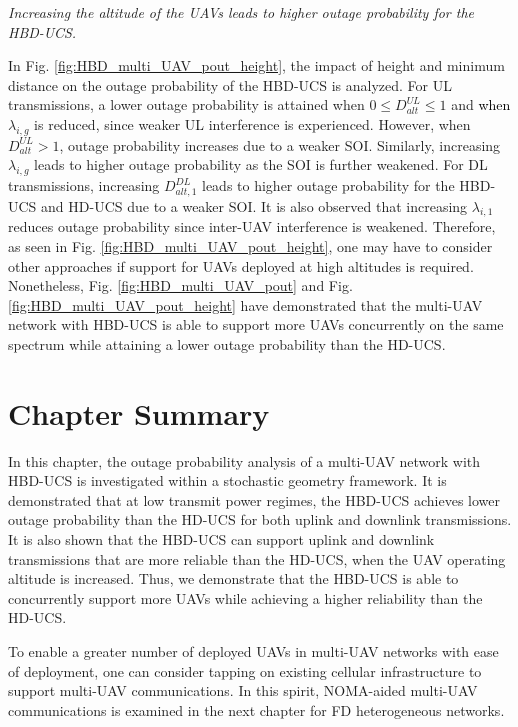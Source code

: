 \begin{observation}
\emph{\emph{Increasing the altitude of the UAVs leads to higher outage probability for the HBD-UCS.}}
\end{observation}

In Fig. \ref{fig:HBD_multi_UAV_pout_height}, the impact of height and minimum distance on the outage probability of the HBD-UCS is analyzed. For UL transmissions, a lower outage probability is attained when $ 0 \leq D_{alt}^{UL} \leq 1$ and \textcolor{black}{when} $\lambda_{i,g}$ is reduced, since weaker UL interference is experienced. However, when $D_{alt}^{UL} > 1$, outage probability increases due to a weaker SOI. Similarly, increasing $\lambda_{i,g}$ leads to higher outage probability as the SOI is further weakened. For DL transmissions, increasing $D_{alt,1}^{DL}$ leads to higher outage probability for the HBD-UCS and HD-UCS due to a weaker SOI. It is also observed that increasing $\lambda_{i,1}$ reduces outage probability since inter-UAV interference is weakened. Therefore, as seen in Fig. \ref{fig:HBD_multi_UAV_pout_height}, one may have to consider other approaches if support for UAVs deployed at high altitudes is required. Nonetheless, Fig. \ref{fig:HBD_multi_UAV_pout} and Fig. \ref{fig:HBD_multi_UAV_pout_height} have demonstrated that the multi-UAV network with HBD-UCS is able to support more UAVs concurrently on the same spectrum while attaining a lower outage probability than the HD-UCS.

\section{Chapter Summary} \label{HBD_multi_UAV_sec_conclusion}

In this chapter, the outage probability analysis of a multi-UAV network with HBD-UCS is investigated within a stochastic geometry framework. It is demonstrated that at low transmit power regimes, the HBD-UCS achieves lower outage probability than the HD-UCS for both uplink and downlink transmissions. It is also shown that the HBD-UCS can support uplink and downlink transmissions that are more reliable than the HD-UCS, when the UAV operating altitude is increased. Thus, we demonstrate that the HBD-UCS is able to concurrently support more UAVs while achieving a higher reliability than the HD-UCS.

To enable a greater number of deployed UAVs in multi-UAV networks with ease of deployment, one can consider tapping on existing cellular infrastructure to support multi-UAV communications. In this spirit, NOMA-aided multi-UAV communications is examined in the next chapter for FD heterogeneous networks. 




\renewcommand{\theobservation}{\thesubsection.\arabic{observation}}


